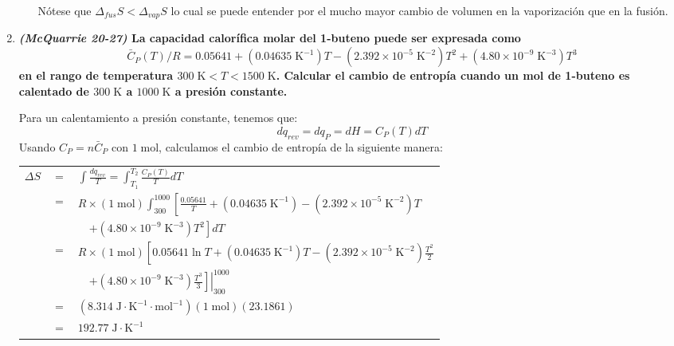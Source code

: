 \documentclass[a4paper,12pt]{article}
\begin{document}
\begin{enumerate}
\begin{enumerate}
N\'otese que $\Delta_{fus}S<\Delta_{vap}S$ lo cual se puede entender por el mucho mayor cambio de volumen en la vaporizaci\'on que en la fusi\'on.

\end{enumerate}

 \item \textbf{\textit{(McQuarrie 20-27)} La capacidad calor\'ifica molar del 1-buteno puede ser expresada como}
$$\bar{C}_P(T)/R=0.05641+(0.04635\;\mbox{K}^{-1})T-(2.392\times 10^{-5}\;\mbox{K}^{-2})T^2+(4.80\times 10^{-9}\;\mbox{K}^{-3})T^3$$
\textbf{en el rango de temperatura $300\;\mbox{K}<T<1500\;\mbox{K}$. Calcular el cambio de entrop\'ia cuando un mol de 1-buteno es calentado de $300\;\mbox{K}$ a $1000\;\mbox{K}$ a presi\'on constante.} %

Para un calentamiento a presi\'on constante, tenemos que: 
$$dq_{rev}=dq_P=dH=C_P(T)dT$$
Usando $C_P=n\bar{C}_P$ con $1\;\mbox{mol}$, calculamos el cambio de entrop\'ia de la siguiente manera:

\begin{center}
\begin{tabular}{r c l}
 $\Delta S$ & $=$ & $\int\frac{dq_{rev}}{T}=\int_{T_1}^{T_2}\frac{C_P(T)}{T}dT$ \\
& $=$ & $R\times(1\;\mbox{mol})\int_{300}^{1000}\left[\frac{0.05641}{T}+(0.04635\;\mbox{K}^{-1})-(2.392\times 10^{-5}\;\mbox{K}^{-2})T\right.$ \\
& & $\quad\left.+(4.80\times 10^{-9}\;\mbox{K}^{-3})T^2\right]dT$ \\
& $=$ & $R\times(1\;\mbox{mol})\left[0.05641\ln T+(0.04635\;\mbox{K}^{-1})T-(2.392\times 10^{-5}\;\mbox{K}^{-2})\frac{T^2}{2}\right.$ \\
& & $\quad\left.\left.+(4.80\times 10^{-9}\;\mbox{K}^{-3})\frac{T^3}{3}\right]\right|_{300}^{1000}$ \\
& $=$ & $(8.314\;\mbox{J}\cdot\mbox{K}^{-1}\cdot\mbox{mol}^{-1})(1\;\mbox{mol})(23.1861)$ \\
& $=$ & $192.77\;\mbox{J}\cdot\mbox{K}^{-1}$
\end{tabular}
\end{center}

\end{enumerate}
\end{document}
